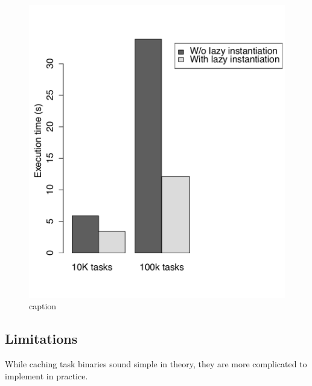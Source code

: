 \begin{figure}[t!]
 \begin{center}
   \includegraphics[scale=0.45]{images_graphs/optimizations/graph1/lazy_micro.pdf}
 \end{center}
 \caption{caption}
 \label{fig:lazy_micro}
\end{figure}

\subsection{Limitations}
While caching task binaries sound simple in theory, they are more complicated to implement in practice. 
